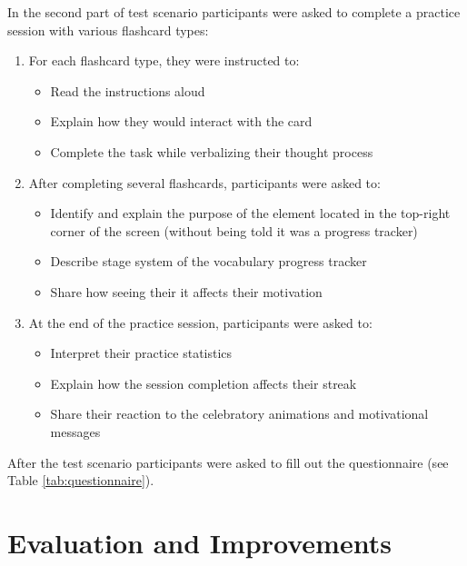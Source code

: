 In the second part of test scenario participants were asked to complete a practice session with various flashcard types:
\begin{enumerate}
    \item For each flashcard type, they were instructed to:
    \begin{itemize}
        \item Read the instructions aloud
        \item Explain how they would interact with the card
        \item Complete the task while verbalizing their thought process
    \end{itemize}

    \item After completing several flashcards, participants were asked to:
    \begin{itemize}
        \item Identify and explain the purpose of the element located in the top-right corner of the screen (without being told it was a progress tracker)
        \item Describe stage system of the vocabulary progress tracker
        \item Share how seeing their it affects their motivation
    \end{itemize}

    \item At the end of the practice session, participants were asked to:
    \begin{itemize}
        \item Interpret their practice statistics
        \item Explain how the session completion affects their streak
        \item Share their reaction to the celebratory animations and motivational messages
    \end{itemize}
\end{enumerate}

After the test scenario participants were asked to fill out the questionnaire (see Table \ref{tab:questionnaire}).

\section{Evaluation and Improvements}

